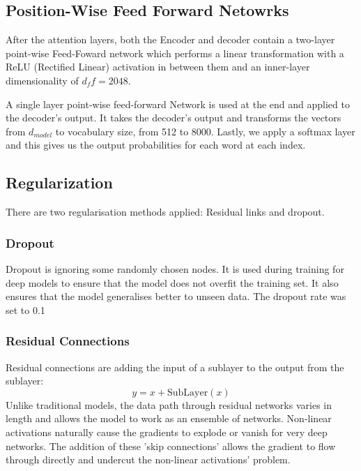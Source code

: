 \documentclass[12pt,a4paper,twoside,openright]{report}
\begin{document}
\subsection{Position-Wise Feed Forward Netowrks}
\label{fc2}
After the attention layers, both the Encoder and decoder contain a two-layer point-wise Feed-Foward network which performs a linear transformation with a ReLU (Rectified Linear) activation in between them and an inner-layer dimensionality of $d_ff=2048$. 

A single layer point-wise feed-forward Network is used at the end and applied to the decoder's output. It takes the decoder's output and transforms the vectors from $d_{model}$ to vocabulary size, from 512 to 8000. Lastly, we apply a softmax layer and this gives us the output probabilities for each word at each index. 

\subsection{Regularization}
\label{regularization}
There are two regularisation methods applied: Residual links and dropout. 

\subsubsection{Dropout}
Dropout is ignoring some randomly chosen nodes. It is used during training for deep models to ensure that the model does not overfit the training set. It also ensures that the model generalises better to unseen data. The dropout rate was set to 0.1 

\subsubsection{Residual Connections}
Residual connections are adding the input of a sublayer to the output from the sublayer: 
\[ y = x + \text{SubLayer}(x)\]
Unlike traditional models, the data path through residual networks varies in length and allows the model to work as an ensemble of networks. Non-linear activations naturally cause the gradients to explode or vanish for very deep networks. The addition of these 'skip connections' allows the gradient to flow through directly and undercut the non-linear activations' problem. 
\end{document}
